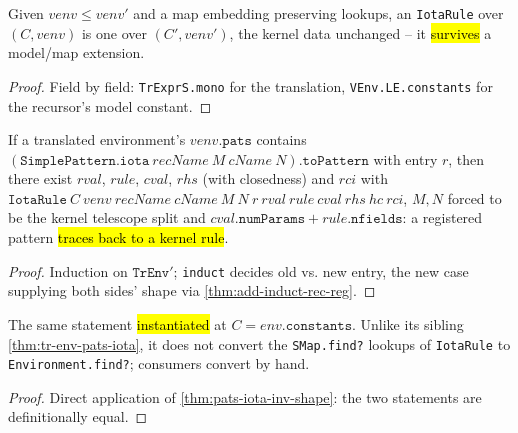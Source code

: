 \begin{lemma}
\label{thm:iota-rule-step}
\leanok
{}

 Given $venv \le venv'$ and a map embedding preserving lookups, an
\texttt{IotaRule} over $(C, venv)$ is one over $(C', venv')$, the kernel data unchanged --
it \hl{survives} a model/map extension.
\end{lemma}
\begin{proof}
\leanok
{} Field by field: \texttt{TrExprS.mono} for the translation,
\texttt{VEnv.LE.constants} for the recursor's model constant.
\end{proof}

\begin{theorem}
\label{thm:pats-iota-inv-shape}
\leanok
{}

 If a translated environment's $venv.\mathtt{pats}$ contains
$(\mathtt{SimplePattern.iota}\ recName\ M\ cName\ N).\mathtt{toPattern}$ with entry $r$,
then there exist $rval$, $rule$, $cval$, $rhs$ (with closedness) and $rci$ with
$\mathtt{IotaRule}\ C\ venv\ recName\ cName\ M\ N\ r\ rval\ rule\ cval\ rhs\ hc\ rci$, $M,N$
forced to be the kernel telescope split and $cval.\mathtt{numParams} +
rule.\mathtt{nfields}$: a registered pattern \hl{traces back to a kernel rule}.
\end{theorem}
\begin{proof}
\leanok
{} Induction on $\mathtt{TrEnv}'$; \texttt{induct} decides old vs. new entry, the
new case supplying both sides' shape via \ref{thm:add-induct-rec-reg}.
\end{proof}

\begin{lemma}
\label{thm:tr-env-pats-iota-inv-shape}
\leanok
{}

 The same statement \hl{instantiated} at $C = env.\mathtt{constants}$.
 Unlike its sibling \ref{thm:tr-env-pats-iota}, it does not convert the
\texttt{SMap.find?} lookups of \texttt{IotaRule} to \texttt{Environment.find?}; consumers
convert by hand.
\end{lemma}
\begin{proof}
\leanok
{} Direct application of \ref{thm:pats-iota-inv-shape}: the two statements are
definitionally equal.
\end{proof}

